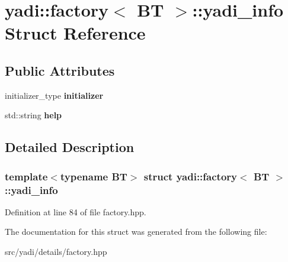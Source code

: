 \hypertarget{structyadi_1_1factory_1_1yadi__info}{}\section{yadi\+:\+:factory$<$ BT $>$\+:\+:yadi\+\_\+info Struct Reference}
\label{structyadi_1_1factory_1_1yadi__info}
\subsection*{Public Attributes}
\begin{DoxyCompactItemize}
\item 
\mbox{\label{structyadi_1_1factory_1_1yadi__info_a63c0e3eb9fd1e8051f5aacee3439c313}} 
initializer\+\_\+type {\bfseries initializer}
\item 
\mbox{\label{structyadi_1_1factory_1_1yadi__info_a5b9a7705a796247d0049755236516015}} 
std\+::string {\bfseries help}
\end{DoxyCompactItemize}


\subsection{Detailed Description}
\subsubsection*{template$<$typename BT$>$\newline
struct yadi\+::factory$<$ B\+T $>$\+::yadi\+\_\+info}



Definition at line 84 of file factory.\+hpp.



The documentation for this struct was generated from the following file\+:\begin{DoxyCompactItemize}
\item 
src/yadi/details/factory.\+hpp\end{DoxyCompactItemize}
